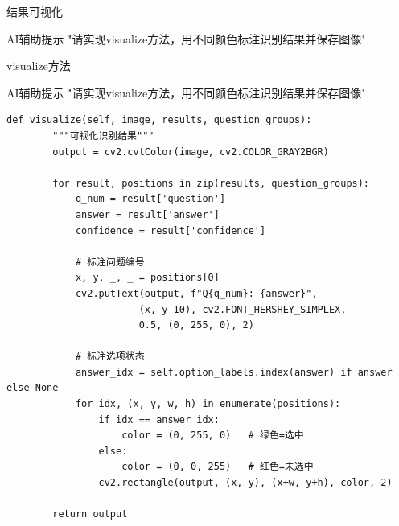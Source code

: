 \begin{frame}[fragile]{结果可视化}
    \begin{block}{AI辅助提示}
        \aihint{} "请实现visualize方法，用不同颜色标注识别结果并保存图像"
    \end{block}

    \begin{block}{visualize方法}
    \begin{block}{AI辅助提示}
        \aihint{} "请实现visualize方法，用不同颜色标注识别结果并保存图像"
    \end{block}

    \begin{lstlisting}[basicstyle=\ttfamily\scriptsize]
    def visualize(self, image, results, question_groups):
        """可视化识别结果"""
        output = cv2.cvtColor(image, cv2.COLOR_GRAY2BGR)

        for result, positions in zip(results, question_groups):
            q_num = result['question']
            answer = result['answer']
            confidence = result['confidence']

            # 标注问题编号
            x, y, _, _ = positions[0]
            cv2.putText(output, f"Q{q_num}: {answer}",
                       (x, y-10), cv2.FONT_HERSHEY_SIMPLEX,
                       0.5, (0, 255, 0), 2)

            # 标注选项状态
            answer_idx = self.option_labels.index(answer) if answer else None
            for idx, (x, y, w, h) in enumerate(positions):
                if idx == answer_idx:
                    color = (0, 255, 0)   # 绿色=选中
                else:
                    color = (0, 0, 255)   # 红色=未选中
                cv2.rectangle(output, (x, y), (x+w, y+h), color, 2)

        return output
    \end{lstlisting}
    \end{block}
\end{frame}

